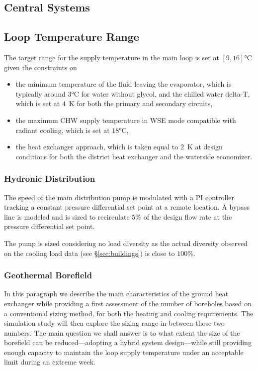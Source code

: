\subsection{Central Systems}

\subsection{Loop Temperature Range} \label{sec:loop_range}

The target range for the supply temperature in the main loop is set at $[9, 16]$°C given the constraints on

\begin{itemize}
    \item the minimum temperature of the fluid leaving the evaporator, which is typically around $3$°C for water without glycol, and the chilled water delta-T, which is set at $4$~K for both the primary and secondary circuits,
    \item the maximum CHW supply temperature in WSE mode compatible with radiant cooling, which is set at $18$°C,
    \item the heat exchanger approach, which is taken equal to $2$~K at design conditions for both the district heat exchanger and the waterside economizer.
\end{itemize}


\subsubsection{Hydronic Distribution} \label{sec:distrib}

The speed of the main distribution pump is modulated with a PI controller tracking a constant pressure differential set point at a remote location. A bypass line is modeled and is sized to recirculate $5\%$ of the design flow rate at the pressure differential set point.

The pump is sized considering no load diversity as the actual diversity observed on the cooling load data (see §\ref{sec:buildings}) is close to $100\%$.

\subsubsection{Geothermal Borefield} \label{sec:geo}

In this paragraph we describe the main characteristics of the ground heat exchanger while providing a first assessment of the number of boreholes based on a conventional sizing method, for both the heating and cooling requirements.
The simulation study will then explore the sizing range in-between those two numbers.
The main question we shall answer is to what extent the size of the borefield can be reduced---adopting a hybrid system design---while still providing enough capacity to maintain the loop supply temperature under an acceptable limit during an extreme week.

